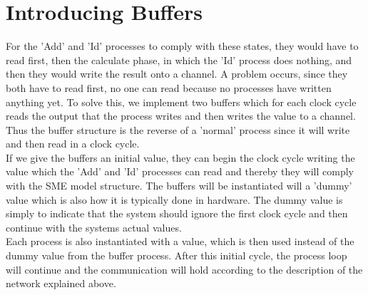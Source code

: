 


\section{Introducing Buffers}

For the 'Add' and 'Id' processes to comply with these states, they would have to read first, then the calculate phase, in which the 'Id' process does nothing, and then they would write the result onto a channel. A problem occurs, since they both have to read first, no one can read because no processes have written anything yet. To solve this, we implement two buffers which for each clock cycle reads the output that the process writes and then writes the value to a channel. Thus the buffer structure is the reverse of a 'normal' process since it will write and then read in a clock cycle. \\
If we give the buffers an initial value, they can begin the clock cycle writing the value which the 'Add' and 'Id' processes can read and thereby they will comply with the SME model structure.
The buffers will be instantiated will a 'dummy' value which is also how it is typically done in hardware. The dummy value is simply to indicate that the system should ignore the first clock cycle and then continue with the systems actual values. \\
Each process is also instantiated with a value, which is then used instead of the dummy value from the buffer process. After this initial cycle, the process loop will continue and the communication will hold according to the description of the network explained above.\\\\

